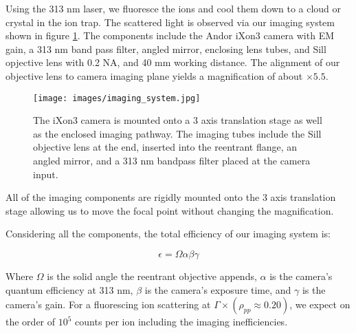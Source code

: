 Using the 313 nm laser, we fluoresce the  ions and cool them down to a cloud or crystal in the ion trap. The scattered light is observed via our imaging system shown in figure \ref{fig: imaging system}. The components include the Andor iXon3 camera with EM gain, a 313 nm band pass filter, angled mirror, enclosing lens tubes, and Sill opjective lens with 0.2 NA, and 40 mm working distance. The alignment of our objective lens to camera imaging plane yields a magnification of about $\times5.5$.

\begin{figure}[H]
	\centering
	\texttt{[image: images/imaging\_system.jpg]}
	\caption{The iXon3 camera is mounted onto a 3 axis translation stage as well as the enclosed imaging pathway. The imaging tubes include the Sill objective lens at the end, inserted into the reentrant flange, an angled mirror, and a 313 nm bandpass filter placed at the camera input.}
	\label{fig: imaging system}
\end{figure}

All of the imaging components are rigidly mounted onto the 3 axis translation stage allowing us to move the focal point without changing the magnification.

\begin{figure}[H]
\end{figure}

Considering all the components, the total efficiency of our imaging system is:

\begin{equation}
	\epsilon = \Omega \alpha \beta \gamma
	\label{eq: fluorescence efficiency}
\end{equation}

Where $\Omega$ is the solid angle the reentrant objective appends, $\alpha$ is the camera's quantum efficiency at 313 nm, $\beta$ is the camera's exposure time, and $\gamma$ is the camera's gain. For a fluorescing ion scattering at $\Gamma \times (\rho_{pp} \approx 0.20)$, we expect on the order of $10^5$ counts per ion including the imaging inefficiencies.